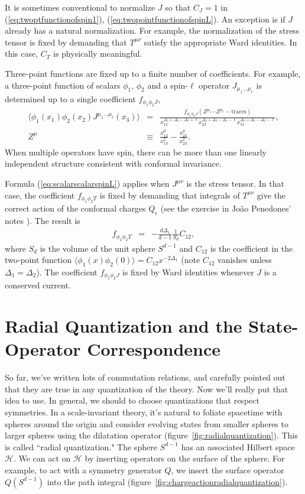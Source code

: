 \documentclass{ws-rv9x6}
\newcommand\be{\begin{eqnarray}}
\newcommand\ee{\end{eqnarray}}
\newcommand\f\phi
\newcommand\e\epsilon
\newcommand\<\langle
\renewcommand\>\rangle
\newcommand\nn{\nonumber}
\renewcommand\.{\cdot}
\newcommand\De{\Delta}
\newcommand\cH{\mathcal{H}}
\begin{document}
It is sometimes conventional to normalize $J$ so that $C_J=1$ in (\ref{eq:twoptfunctionofspin1}), (\ref{eq:twopointfunctionofspinL}).  An exception is if $J$ already has a natural normalization.  For example, the normalization of the stress tensor is fixed by demanding that $T^{\mu\nu}$ satisfy the appropriate Ward identities.  In this case, $C_T$ is physically meaningful.

Three-point functions are fixed up to a finite number of coefficients.  For example, a three-point function of scalars $\phi_{1}$, $\phi_2$ and a spin-$\ell$ operator $J_{\mu_1\dots\mu_\ell}$ is determined up to a single coefficient $f_{\f_1\f_2 J}$,
\be
\label{eq:scalarscalarspinL}
\<\f_1(x_1)\f_2(x_2)J^{\mu_1\dots\mu_\ell}(x_3)\> &=& \frac{f_{\f_1\f_2 J}(Z^{\mu_1}\cdots Z^{\mu_\ell} - \mathrm{traces})}{x_{12}^{\De_1+\De_2-\De_3+\ell}x_{23}^{\De_2+\De_3-\De_1-\ell}x_{31}^{\De_3+\De_1-\De_2-\ell}},\nn\\
Z^\mu &\equiv& \frac{x_{13}^\mu}{x_{13}^2}-\frac{x_{23}^\mu}{x_{23}^2}.
\ee
When multiple operators have spin, there can be more than one linearly independent structure consistent with conformal invariance.

Formula (\ref{eq:scalarscalarspinL}) applies when $J^{\mu\nu}$ is the stress tensor.  In that case, the coefficient $f_{\phi_1\phi_2 T}$ is fixed by demanding that integrals of $T^{\mu\nu}$ give the correct action of the conformal charges $Q_\e$ (see the exercise in Jo\~ao Penedones' notes \cite{Joao}). The result is 
\be
\label{eq:stresstensorward}
f_{\phi_1\phi_2 T} &=& -\frac{d\De_1}{d-1}\frac 1 {S_d} C_{12},
\ee
where $S_d$ is the volume of the unit sphere $S^{d-1}$ and $C_{12}$ is the coefficient in the two-point function $\<\phi_1(x)\phi_2(0)\>=C_{12}x^{-2\De_1}$ (note $C_{12}$ vanishes unless $\Delta_1=\Delta_2$). The coefficient $f_{\phi_1\phi_2 J}$ is fixed by Ward identities whenever $J$ is a conserved current.

\section{Radial Quantization and the State-Operator Correspondence}


So far, we've written lots of commutation relations, and carefully pointed out that they are true in any quantization of the theory. Now we'll really put that idea to use.  In general, we should to choose quantizations that respect symmetries.  In a scale-invariant theory, it's natural to foliate spacetime with spheres around the origin and consider evolving states from smaller spheres to larger spheres using the dilatation operator (figure~\ref{fig:radialquantization}).  This is called ``radial quantization." The sphere $S^{d-1}$ has an associated Hilbert space $\cH$. We can act on $\cH$ by inserting operators on the surface of the sphere. For example, to act with a symmetry generator $Q$, we insert the surface operator $Q(S^{d-1})$ into the path integral (figure~\ref{fig:chargeactionradialquantization}).
\end{document}

